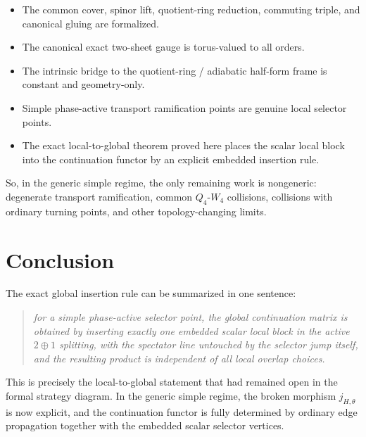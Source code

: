 \documentclass[11pt]{article}
\numberwithin{equation}{section}
\theoremstyle{definition}
\begin{document}
\begin{itemize}
  \item The common cover, spinor lift, quotient-ring reduction, commuting triple, and canonical gluing are formalized.
  \item The canonical exact two-sheet gauge is torus-valued to all orders.
  \item The intrinsic bridge to the quotient-ring / adiabatic half-form frame is constant and geometry-only.
  \item Simple phase-active transport ramification points are genuine local selector points.
  \item The exact local-to-global theorem proved here places the scalar local block into the continuation functor by an explicit embedded insertion rule.
\end{itemize}

So, in the generic simple regime, the only remaining work is nongeneric: degenerate transport ramification, common $Q_4$-$W_4$ collisions, collisions with ordinary turning points, and other topology-changing limits.

\section{Conclusion}

The exact global insertion rule can be summarized in one sentence:
\begin{quote}\itshape
for a simple phase-active selector point, the global continuation matrix is obtained by inserting exactly one embedded scalar local block in the active $2\oplus 1$ splitting, with the spectator line untouched by the selector jump itself, and the resulting product is independent of all local overlap choices.
\end{quote}

This is precisely the local-to-global statement that had remained open in the formal strategy diagram. In the generic simple regime, the broken morphism $j_{H,\theta}$ is now explicit, and the continuation functor is fully determined by ordinary edge propagation together with the embedded scalar selector vertices.
\end{document}
